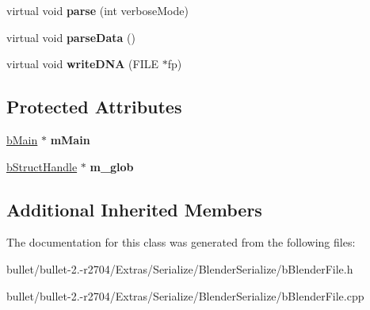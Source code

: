 \begin{DoxyCompactItemize}
\item 
\hypertarget{classb_parse_1_1b_blender_file_a25bb5d929b0bc2f35b038351914bd0d3}{virtual void {\bfseries parse} (int verbose\+Mode)}\label{classb_parse_1_1b_blender_file_a25bb5d929b0bc2f35b038351914bd0d3}

\item 
\hypertarget{classb_parse_1_1b_blender_file_af8c6e463f815409c00b83f1cffd58aec}{virtual void {\bfseries parse\+Data} ()}\label{classb_parse_1_1b_blender_file_af8c6e463f815409c00b83f1cffd58aec}

\item 
\hypertarget{classb_parse_1_1b_blender_file_a38f9c983231acd43150ae38b25cde250}{virtual void {\bfseries write\+D\+N\+A} (F\+I\+L\+E $\ast$fp)}\label{classb_parse_1_1b_blender_file_a38f9c983231acd43150ae38b25cde250}

\end{DoxyCompactItemize}
\subsection*{Protected Attributes}
\begin{DoxyCompactItemize}
\item 
\hypertarget{classb_parse_1_1b_blender_file_a0b680411aaed4f3f294bb49b35adede5}{\hyperlink{classb_parse_1_1b_main}{b\+Main} $\ast$ {\bfseries m\+Main}}\label{classb_parse_1_1b_blender_file_a0b680411aaed4f3f294bb49b35adede5}

\item 
\hypertarget{classb_parse_1_1b_blender_file_a37f9575e4e60081a3d52da4b4aa585ca}{\hyperlink{structb_parse_1_1b_struct_handle}{b\+Struct\+Handle} $\ast$ {\bfseries m\+\_\+glob}}\label{classb_parse_1_1b_blender_file_a37f9575e4e60081a3d52da4b4aa585ca}

\end{DoxyCompactItemize}
\subsection*{Additional Inherited Members}


The documentation for this class was generated from the following files\+:\begin{DoxyCompactItemize}
\item 
bullet/bullet-\/2.-\/r2704/\+Extras/\+Serialize/\+Blender\+Serialize/b\+Blender\+File.\+h\item 
bullet/bullet-\/2.-\/r2704/\+Extras/\+Serialize/\+Blender\+Serialize/b\+Blender\+File.\+cpp\end{DoxyCompactItemize}

